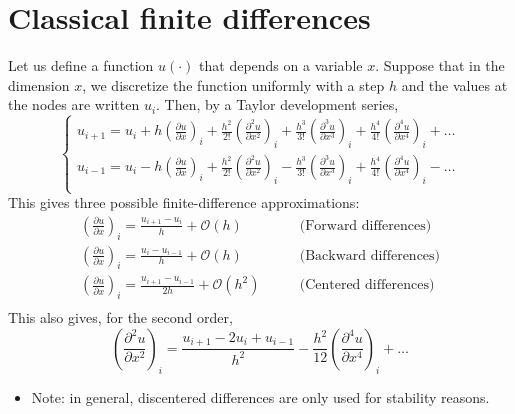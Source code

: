 \documentclass[12pt, openany]{report}
\theoremstyle{definition}
\begin{document}
\section{Classical finite differences}
Let us define a function $u(\cdot)$ that depends on a variable $x$. Suppose that in the dimension $x$, we discretize the function uniformly with a step $h$ and the values at the nodes are written $u_i$. Then, by a Taylor development series,
\begin{equation}
	\begin{cases}
		u_{i+1} = u_i + h\left(\frac{\partial u}{\partial x}\right)_i + \frac{h^2}{2!}\left(\frac{\partial^2 u}{\partial x^2}\right)_i + \frac{h^3}{3!}\left(\frac{\partial^3 u}{\partial x^3}\right)_i + \frac{h^4}{4!} \left(\frac{\partial^4 u}{\partial x^4}\right)_i + \dots \\
		u_{i-1} = u_i - h\left(\frac{\partial u}{\partial x}\right)_i + \frac{h^2}{2!}\left(\frac{\partial^2 u}{\partial x^2}\right)_i - \frac{h^3}{3!}\left(\frac{\partial^3 u}{\partial x^3}\right)_i + \frac{h^4}{4!} \left(\frac{\partial^4 u}{\partial x^4}\right)_i - \dots \\
	\end{cases}
\end{equation}
This gives three possible finite-difference approximations:
\begin{equation}
	\begin{aligned}
		\left(\frac{\partial u}{\partial x}\right)_i = \frac{u_{i+1}-u_i}{h} + \mathcal{O}(h) & \qquad \text{(Forward differences)}\\
		\left(\frac{\partial u}{\partial x}\right)_i = \frac{u_{i}-u_{i-1}}{h} + \mathcal{O}(h) & \qquad \text{(Backward differences)}\\
		\left(\frac{\partial u}{\partial x}\right)_i = \frac{u_{i+1}-u_{i-1}}{2h} + \mathcal{O}(h^2) & \qquad \text{(Centered differences)}\\
	\end{aligned}
\end{equation}
This also gives, for the second order, 
\begin{equation}
	\left(\frac{\partial^2 u}{\partial x^2}\right)_i = \frac{u_{i+1}-2u_i+u_{i-1}}{h^2} - \frac{h^2}{12} \left(\frac{\partial^4u}{\partial x^4}\right)_i + \dots 
\end{equation}
\begin{itemize}
	\item [$\to$] Note: in general, discentered differences are only used for stability reasons.
\end{itemize}
\end{document}
